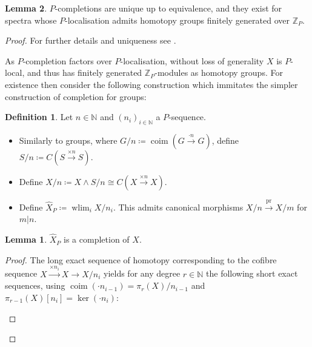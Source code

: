 \documentclass[english]{scrartcl}
\theoremstyle{definition}
\newtheorem*{Def}{Definition}
\newtheorem*{Lem}{Lemma}
\theoremstyle{remark}
\newcommand*{\N}{\mathds{N}}
\newcommand*{\Z}[1][]{\mathds{Z}_{#1}}  %
\newcommand*{\smashed}{\wedge}
\newcommand*{\Cone}[1]{C(#1)}
\newcommand*{\Sph}{S} %
\newcommand*{\Ps}{P}  %
\newcommand*{\pistar}[2][*]{\pi_{#1}(#2)}  %
\newcommand*{\compl}[2][\Ps]{\hat{#2}_{#1}}  %
\DeclareMathOperator{\wlim}{wlim}  %
\begin{document}
\begin{Lem}
  $\Ps$-completions are unique up to equivalence, and they exist for
  spectra whose $\Ps$-localisation admits homotopy groups finitely
  generated over $\Z[\Ps]$.
  \begin{proof}
    For further details and uniqueness see \cite[Thm. 9.1]{margolis}.

    As $\Ps$-completion factors over $\Ps$-localisation, without loss
    of generality $X$ is $\Ps$-local, and thus has finitely
    generated $\Z[\Ps]$-modules as homotopy groups.
    For existence then consider the following construction which
    immitates the simpler construction of completion for groups:
    \begin{Def}
      Let $n\in\N$ and $(n_i)_{i\in\N}$ a $\Ps$-sequence.
      \begin{itemize}
      \item Similarly to groups, where
        $G/n\coloneqq \operatorname{coim}(G\xrightarrow{\cdot n} G)$,
        define
        $\Sph/n\coloneqq\Cone{\Sph\xrightarrow{\times n}\Sph}$.
      \item Define $X/n\coloneqq X\smashed S/n
        \cong \Cone{X\xrightarrow{\times n} X}$.
      \item Define 
        $\compl{X}\coloneqq\wlim_{i} X/n_i$.
        This admits canonical morphisms $X/n\xrightarrow{\text{pr}} X/m$ for $m|n$.
      \end{itemize}
    \end{Def}
    \begin{Lem}
      $\compl{X}$ is a completion of $X$.
      \begin{proof}
        The long exact sequence of homotopy corresponding to the
        cofibre sequence $X\xrightarrow{\times n_i}X\to X/n_i$
        yields for any degree $r\in\N$ the following short exact
        sequences, using
        $\operatorname{coim}(\cdot n_{i-1}) = \pistar[r]{X}/n_{i-1}$
        and
        $\pistar[r-1]{X}[n_i] = \operatorname{ker}(\cdot n_i)$:
        \begin{center}
\end{center}
\end{proof}
\end{Lem}
\end{proof}
\end{Lem}
\end{document}
